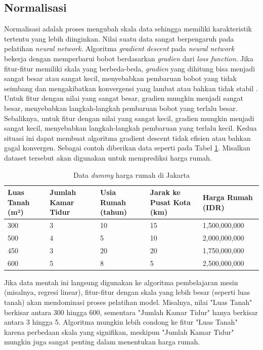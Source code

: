 \subsection{Normalisasi}
Normalisasi adalah proses mengubah skala data sehingga memiliki karakteristik tertentu yang lebih diinginkan. Nilai suatu data sangat berpengaruh pada pelatihan \textit{neural network}. Algoritma \textit{gradient descent} pada \textit{neural network} bekerja dengan memperbarui bobot berdasarkan \textit{gradien} dari \textit{loss function}. Jika fitur-fitur memiliki skala yang berbeda-beda, \textit{gradien} yang dihitung bisa menjadi sangat besar atau sangat kecil, menyebabkan pembaruan bobot yang tidak seimbang dan mengakibatkan konvergensi yang lambat atau bahkan tidak stabil \cite{Langr2019-xk}. Untuk fitur dengan nilai yang sangat besar, gradien mungkin menjadi sangat besar, menyebabkan langkah-langkah pembaruan bobot yang terlalu besar. Sebaliknya, untuk fitur dengan nilai yang sangat kecil, gradien mungkin menjadi sangat kecil, menyebabkan langkah-langkah pembaruan yang terlalu kecil. Kedua situasi ini dapat membuat algoritma gradient descent tidak efisien atau bahkan gagal konvergen. Sebagai contoh diberikan data seperti pada Tabel \ref{tab:hargarumah}. Misalkan dataset tersebut akan digunakan untuk memprediksi harga rumah.

\begin{table}[H]
    \centering
    \begin{tabular}{||p{5em}|p{5em}|p{5em}|p{5em}|p{6em}||}
    \hline
       Luas Tanah (m²) & Jumlah Kamar Tidur & Usia Rumah (tahun) & Jarak ke Pusat Kota (km) & Harga Rumah (IDR)\\ [0.5ex]
        \hline\hline
       300 & 3 & 10 & 15 & 1,500,000,000\\ \hline
       500 & 4 & 5 & 10 & 2,000,000,000\\ \hline
       450 & 3 & 20 & 20 & 1,750,000,000\\ \hline
       600 & 5 & 8 & 5 &2,500,000,000\\ \hline
    \end{tabular}
    \caption{Data \textit{dummy} harga rumah di Jakarta}
    \label{tab:hargarumah}
\end{table}

Jika data mentah ini langsung digunakan ke algoritma pembelajaran mesin (misalnya, regresi linear), fitur-fitur dengan skala yang lebih besar (seperti luas tanah) akan mendominasi proses pelatihan model. Misalnya, nilai "Luas Tanah" berkisar antara 300 hingga 600, sementara "Jumlah Kamar Tidur" hanya berkisar antara 3 hingga 5. Algoritma mungkin lebih condong ke fitur "Luas Tanah" karena perbedaan skala yang signifikan, meskipun "Jumlah Kamar Tidur" mungkin juga sangat penting dalam menentukan harga rumah.

